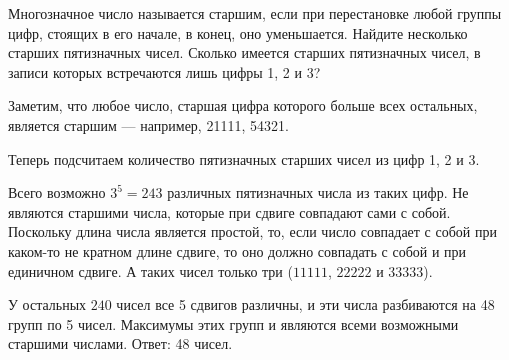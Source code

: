 \begin{itemize}
%
%
%

\itC Многозначное число называется старшим, если при перестановке любой 
группы цифр, стоящих в его начале, в конец, оно уменьшается. Найдите 
несколько старших пятизначных чисел. Сколько имеется старших пятизначных 
чисел, в записи которых встречаются лишь цифры 1, 2 и 3?

\itr 
Заметим, что любое число, старшая цифра 
которого больше всех остальных, является старшим --- например, 21111, 54321. 

Теперь подсчитаем количество пятизначных старших чисел из цифр 1, 2 и 3.

Всего возможно $3^5 = 243$ различных пятизначных числа из таких цифр.
Не являются старшими числа, которые при сдвиге совпадают 
сами с собой. Поскольку длина числа является простой, то, если число совпадает 
с собой при каком-то не кратном длине сдвиге, то оно должно совпадать с собой 
и при единичном сдвиге. А таких чисел только три ($11111$, $22222$ и $33333$). 

У остальных $240$ чисел все 5 сдвигов различны, и эти числа разбиваются
на 48 групп по 5 чисел. 
Максимумы этих групп и являются всеми возможными старшими числами. Ответ: 48 чисел.
\end{itemize}


